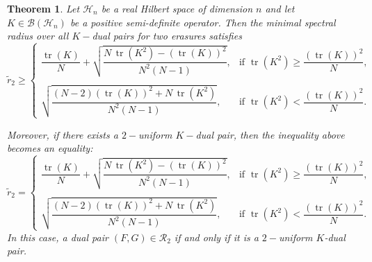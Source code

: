\documentclass[final,1p,times]{elsarticle}
\newtheorem{thm}{Theorem}[section]
\begin{document}
	
	\begin{thm}\label{theorem3point5twoerasure}
Let \( \mathcal{H}_n \) be a real Hilbert space of dimension \( n \) and let \( K \in \mathcal{B}(\mathcal{H}_n) \) be a positive semi-definite operator. Then the minimal spectral radius over all $K-$dual pairs for two erasures satisfies
\[
\tilde{r}_{2} \geq 
\begin{cases}
\dfrac{\operatorname{tr}(K)}{N} + \sqrt{\dfrac{N\,\operatorname{tr}(K^2) - \left(\operatorname{tr}(K)\right)^2}{N^2(N-1)}}, & \text{if } \operatorname{tr}(K^2) \geq \dfrac{\left(\operatorname{tr}(K)\right)^2}{N},\\~\\
\sqrt{\dfrac{(N-2)\left(\operatorname{tr}(K)\right)^2 + N\,\operatorname{tr}(K^2)}{N^2(N-1)}}, & \text{if } \operatorname{tr}(K^2) < \dfrac{\left(\operatorname{tr}(K)\right)^2}{N}.
\end{cases}
\]

Moreover, if there exists a  $2-$uniform \( K-\)dual pair, then the inequality above becomes an equality:
\begin{equation}\label{equation7expression}
\tilde{r}_{2} = 
\begin{cases}
\dfrac{\operatorname{tr}(K)}{N} + \sqrt{\dfrac{N\,\operatorname{tr}(K^2) - \left(\operatorname{tr}(K)\right)^2}{N^2(N-1)}}, & \text{if } \operatorname{tr}(K^2) \geq \dfrac{\left(\operatorname{tr}(K)\right)^2}{N},\\~\\
\sqrt{\dfrac{(N-2)\left(\operatorname{tr}(K)\right)^2 + N\,\operatorname{tr}(K^2)}{N^2(N-1)}}, & \text{if } \operatorname{tr}(K^2) < \dfrac{\left(\operatorname{tr}(K)\right)^2}{N}.
\end{cases}
\end{equation}
In this case, a dual pair \( (F, G) \in \mathcal{R}_2 \) if and only if it is a  $2-$uniform \( K \)-dual pair.
\end{thm}
\end{document}
